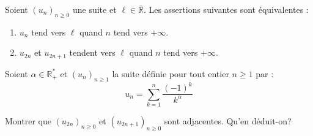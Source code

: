 \documentclass[a4paper,10pt]{report}
\begin{document}
\begin{prop} Soient $(u_n)_{n \geq 0}$ une suite et $\ell \in \overline{\mathbb{R}}$. Les assertions suivantes sont équivalentes :

\begin{enumerate}
\item $u_n$ tend vers $\ell$ quand $n$ tend vers $+ \infty$.
\item $u_{2n}$ et $u_{2n+1}$ tendent vers $\ell$ quand $n$ tend vers $+ \infty$.
\end{enumerate}
\end{prop}

\begin{ex} Soient $\alpha \in \mathbb{R}_+^*$ et $(u_n)_{n \geq 1}$ la suite définie pour tout entier $n \geq 1$ par :
$$ u_n = \sum_{k=1}^n \frac{(-1)^k}{k^{\alpha}}$$

\medskip

\noindent Montrer que $(u_{2n})_{n \geq 0}$ et $(u_{2n+1})_{n \geq 0}$ sont adjacentes. Qu'en déduit-on?
%
%
%
\newpage
\end{ex}
\end{document}
